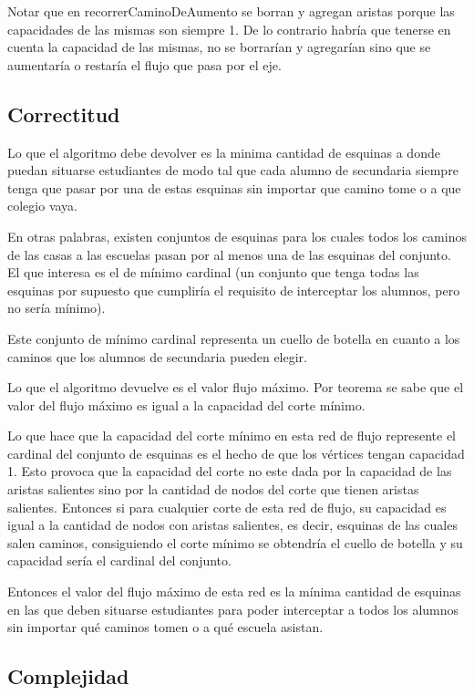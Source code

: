 Notar que en recorrerCaminoDeAumento se borran y agregan aristas porque las capacidades de las mismas son siempre 1. De lo contrario habría que tenerse en cuenta la capacidad de las mismas, no se borrarían y agregarían sino que se aumentaría o restaría el flujo que pasa por el eje.

\subsection{Correctitud}

Lo que el algoritmo debe devolver es la minima cantidad de esquinas a donde puedan situarse estudiantes de modo tal que cada alumno de secundaria siempre tenga que pasar por una de estas esquinas sin importar que camino tome o a que colegio vaya.

En otras palabras, existen conjuntos de esquinas para los cuales todos los caminos de las casas a las escuelas pasan por al menos una de las esquinas del conjunto. El que interesa es el de mínimo cardinal (un conjunto que tenga todas las esquinas por supuesto que cumpliría el requisito de interceptar los alumnos, pero no sería mínimo).

Este conjunto de mínimo cardinal representa un cuello de botella en cuanto a los caminos que los alumnos de secundaria pueden elegir.

Lo que el algoritmo devuelve es el valor flujo máximo. Por teorema se sabe que el valor del flujo máximo es igual a la capacidad del corte mínimo.

Lo que hace que la capacidad del corte mínimo en esta red de flujo represente el cardinal del conjunto de esquinas es el hecho de que los vértices tengan capacidad 1. Esto provoca que la capacidad del corte no este dada por la capacidad de las aristas salientes sino por la cantidad de nodos del corte que tienen aristas salientes. Entonces si para cualquier corte de esta red de flujo, su capacidad es igual a la cantidad de nodos con aristas salientes, es decir, esquinas de las cuales salen caminos, consiguiendo el corte mínimo se obtendría el cuello de botella y su capacidad sería el cardinal del conjunto.

Entonces el valor del flujo máximo de esta red es la mínima cantidad de esquinas en las que deben situarse estudiantes para poder interceptar a todos los alumnos sin importar qué caminos tomen o a qué escuela asistan.

\subsection{Complejidad}

